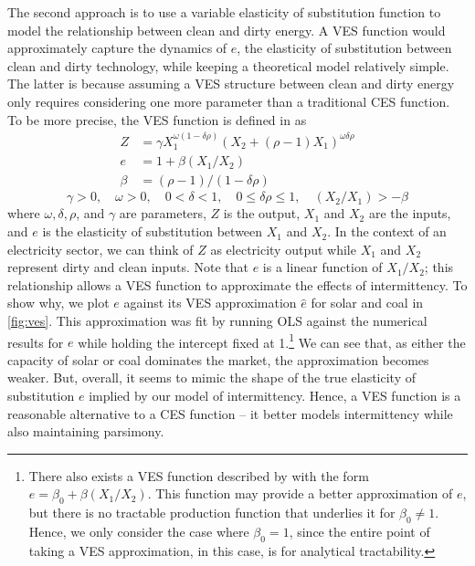 \documentclass[11pt,a4paper,leqno]{extarticle}
\begin{document}
	
	The second approach is to use a variable elasticity of substitution function to model the relationship between clean and dirty energy.  A VES function would approximately capture the dynamics of $e$, the elasticity of substitution between clean and dirty technology,  while keeping a theoretical model relatively simple. The latter is because assuming a VES structure between clean and dirty energy only requires considering one more parameter than a traditional CES function. To be more precise, the VES function is defined in \citet{VES} as
	\begin{align}
	Z &= \gamma X_1^{\omega(1-\delta \rho)} \left( X_2 + (\rho - 1) X_1 \right)^{\omega \delta \rho} \\
	e &= 1 + \beta (X_1 / X_2) \\
	\beta &= (\rho - 1) / ( 1- \delta \rho ) 
	\end{align}
	\vspace{-4ex}
	$$\gamma > 0, \quad \omega > 0, \quad0 < \delta < 1, \quad 0 \leq \delta \rho \leq 1 , \quad (X_2/X_1) >  -\beta $$
	where $\omega, \delta, \rho$, and $\gamma$ are parameters, $Z$ is the output, $X_1$ and $X_2$ are the inputs, and $e$ is the elasticity of substitution between $X_1$ and $X_2$. In the context of an electricity sector, we can think of $Z$ as electricity output while $X_1$ and $X_2$ represent dirty and clean inputs. Note that $e$ is a linear function of $X_1/X_2$; this relationship allows a VES function to approximate the effects of intermittency. To show why, we plot $e$ against its VES approximation $\hat{e}$ for solar and coal in \autoref{fig:ves}. This approximation was fit by running OLS against the numerical results for $e$ while holding the intercept fixed at 1.\footnote{ There also exists a VES function described by \citet{VES} with the form $e = \beta_0 + \beta (X_1/X_2)$. This function may provide a better approximation of $e$, but there is no tractable production function that underlies it for $\beta_0 \neq 1$. Hence, we only consider the case where $\beta_0 = 1$, since the entire point of taking a VES approximation, in this case, is for analytical tractability. } We can see that, as either the capacity of solar or coal dominates the market, the approximation becomes weaker. But, overall, it seems to mimic the shape of the true elasticity of substitution $e$ implied by our model of intermittency. Hence, a  VES function is a reasonable alternative to a CES function -- it better models intermittency while also maintaining parsimony. 
	
\end{document}
